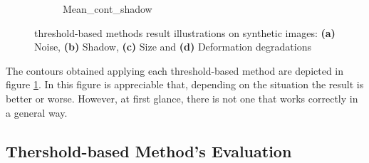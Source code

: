 \begin{figure}[htbp]
\begin{subfigure}[t]{0.15\textwidth}
{    {Mean_cont_shadow}}
    \caption{} 
\end{subfigure}\qquad
\begin{subfigure}[t]{0.15\textwidth}
    \caption{} 
\end{subfigure}\qquad
\begin{subfigure}[t]{0.15\textwidth}
    \caption{}  
\end{subfigure}
\caption{threshold-based methods result illustrations on synthetic images: \textbf{(a)} Noise, \textbf{(b)} Shadow, \textbf{(c)} Size and \textbf{(d)} Deformation degradations}\label{fig:thr_synth_comparison}
\end{figure}

The contours obtained applying each threshold-based method are depicted in figure \ref{fig:thr_synth_comparison}. In this figure is appreciable that, depending on the situation the result is better or worse. However, at first glance, there is not one that works correctly in a general way.

\subsection{Thershold-based Method's Evaluation}



